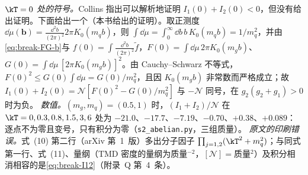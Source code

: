 \begin{example}
\emph{$\kT=0$ 处的符号。}Collins 指出可以解析地证明 $I_1(0)+I_2(0)<0$，但没有给出证明\cite{Collins2007}。下面给出一个（本书给出的证明）。取正测度 $\dd\mu(\boldsymbol b)=\frac{\dd^2b}{(2\pi)^2}2\pi K_0(m_qb)$，则 $\int\dd\mu=\int_0^\infty\dd b\,b\,K_0(m_qb)=1/m_q^2$，并由\cref{eq:break-FG-b}与 $f(0)=\int\frac{\dd^2b}{(2\pi)^2}\tilde f$，$F(0)=\int\dd\mu\,2\pi K_0(m_gb)$、$G(0)=\int\dd\mu\,[2\pi K_0(m_gb)]^2$。由 Cauchy--Schwarz 不等式，$F(0)^2\le G(0)\int\dd\mu=G(0)/m_q^2$，且因 $K_0(m_gb)$ 非常数而严格成立；故 $I_1(0)+I_2(0)=\mathcal N[F(0)^2-G(0)/m_q^2]$ 与 $-\mathcal N$ 同号，在 $g_2(g_2+g_1)>0$ 时为负。
\emph{数值。}$(m_g,m_q)=(0.5,1)$ 时，$(I_1+I_2)/\mathcal N$ 在 $\kT=0,0.3,0.8,1.5,3,6$ 处为 $-21.0$、$-17.7$、$-7.19$、$-0.70$、$+0.38$、$+0.089$：逐点不为零且变号，只有积分为零（\texttt{s2\_abelian.py}，三组质量）。
\emph{原文的印刷错误。}\cite{Collins2007}式~(10) 第二行（arXiv 第~1~版）多出分子因子 $\prod_{j=1,2}(\kT^2+m_q^2)$；与同式第一行、式~(11)、量纲（TMD 密度的量纲为质量$^{-2}$，$[\mathcal N]=$质量$^2$）及积分相消相容的是\cref{eq:break-I12}（附录~Q 第~4~条）。
\end{example}
